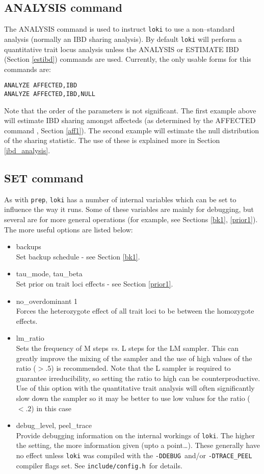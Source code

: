 \documentclass[10pt,a4paper]{article}
\newcommand{\Prep}{\texttt{prep}\xspace}
\newcommand{\Loki}{\texttt{loki}\xspace}
\begin{document}
\subsection{ANALYSIS command}\label{analysis1}
The ANALYSIS command is used to instruct \Loki to use a non--standard
analysis (normally an IBD sharing analysis).  By default \Loki will perform
a quantitative trait locus analysis unless the ANALYSIS or ESTIMATE IBD
(Section \ref{estibd}) commands are used. Currently, the only usable forms
for this commands are:
\begin{verbatim}
ANALYZE AFFECTED,IBD
ANALYZE AFFECTED,IBD,NULL
\end{verbatim}
Note that the order of the parameters is not significant.  The first example
above will estimate IBD sharing amongst affecteds (as determined by the
AFFECTED command , Section \ref{aff1}).  The second example will estimate
the null distribution of the sharing statistic.  The use of these is
explained more in Section \ref{ibd_analysis}.
\subsection{SET command}\label{set1}
As with \Prep, \Loki has a number of internal variables which can be set to
influence the way it runs.  Some of these variables are mainly for
debugging, but several are for more general operations (for example, see
Sections \ref{bk1}, \ref{prior1}).  The more useful options are listed below:
\begin{itemize}
  \item backups\\
	 Set backup schedule - see Section \ref{bk1}.
  \item tau\_mode, tau\_beta\\
	 Set prior on trait loci effects - see Section \ref{prior1}.
  \item no\_overdominant 1\\
	 \label{lab_nooverdom}
	 Forces the heterozygote effect of all trait loci to be between the
	 homozygote effects.
  \item lm\_ratio\\
	 Sets the frequency of M steps \emph{vs.} L steps for the LM sampler.
	 This can greatly improve the mixing of the sampler and the use of high
values of the ratio ($>.5$) is recommended.  Note that the L sampler is
required to guarantee irreducibility, so setting the ratio to high can be
counterproductive.
	 Use of this option with the quantitative
	 trait analysis will often significantly slow down the sampler so it may
	 be better to use low values for the ratio ($<.2$) in this case
  \item debug\_level, peel\_trace\\
	 Provide debugging information on the internal workings of \Loki.  The
higher the setting, the more information given (upto a point{\ldots}). These
generally have no effect unless \Loki was compiled with the \verb+-DDEBUG+\
and/or \verb+-DTRACE_PEEL+ compiler flags set.  See \verb+include/config.h+\ 
for details.
\end{itemize}
\end{document}

